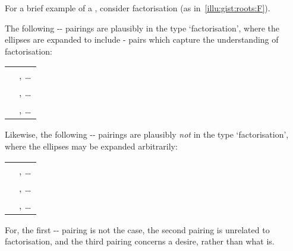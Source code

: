 \begin{note}
  For a brief example of a \torN{}, consider factorisation (as in~\autoref{illu:gist:roots:F}).

  The following \prop{}-\val{}-\pool{} pairings are plausibly in the type `factorisation', where the ellipses are expanded to include - pairs which capture the \agents{} understanding of factorisation:
  \begin{center}
    \begin{tabular}{R{.45\textwidth} L{.45\textwidth}}
       & , \dots \\
       & , \dots \\
       & , \dots \\
    \end{tabular}
  \end{center}
  Likewise, the following -\val{}-\pool{} pairings are plausibly \emph{not} in the type `factorisation', where the ellipses may be expanded arbitrarily:

  \begin{center}
    \begin{tabular}{R{.45\textwidth} L{.45\textwidth}}
       & , \dots \\
       & , \dots \\
       & , \dots \\
    \end{tabular}
  \end{center}

  \noindent%
  For, the first -- pairing is not the case, the second pairing is unrelated to factorisation, and the third pairing concerns a desire, rather than what is.
\end{note}


